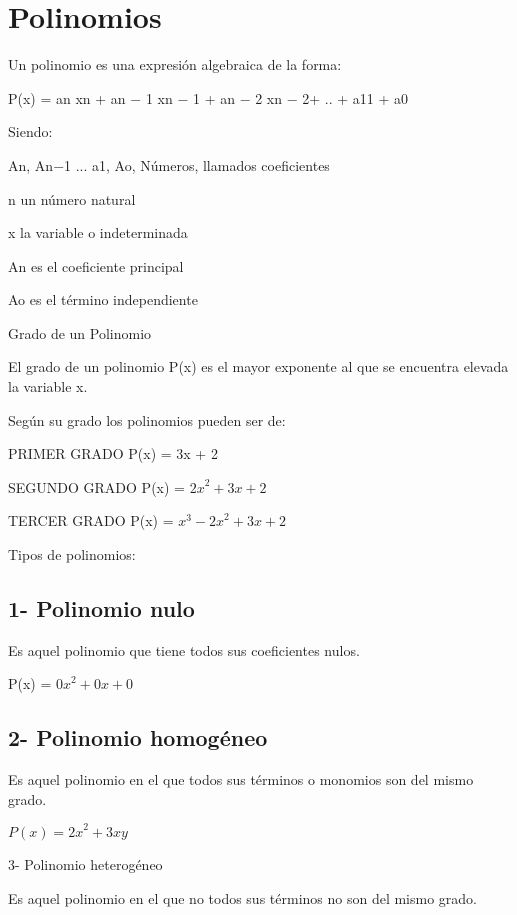 \documentclass{article}
\begin{document}
\bigskip

\section[Polinomios]{Polinomios}

\bigskip

Un polinomio es una expresi\'on algebraica de la forma:

P(x) = an xn + an $-$ 1 xn $-$ 1 + an $-$ 2 xn $-$ 2+ .. + a11 + a0


\bigskip

Siendo:

An, An$-$1 ... a1, Ao, N\'umeros, llamados coeficientes

n un n\'umero natural

x la variable o indeterminada

An es el coeficiente principal

Ao es el t\'ermino independiente

Grado de un Polinomio

El grado de un polinomio P(x) es el mayor exponente al que se encuentra elevada la variable x.

Seg\'un su grado los polinomios pueden ser de: \ 

PRIMER GRADO P(x) = 3x + 2

SEGUNDO GRADO P(x) = ${2x}^{2}+3x+2$

TERCER GRADO P(x) = $x^{3}-{2x}^{2}+3x+2$


\bigskip

Tipos de polinomios:

\subsection[1{}- Polinomio nulo]{1- Polinomio nulo}
Es aquel polinomio que tiene todos sus coeficientes nulos.

P(x) =  ${0x}^{2}+0x+0$


\bigskip

\subsection[2{}- Polinomio homog\'eneo]{2- Polinomio homog\'eneo}
Es aquel polinomio en el que todos sus t\'erminos o monomios son del mismo grado.

 $P(x)={2x}^{2}+3xy$

3- Polinomio heterog\'eneo

Es aquel polinomio en el que no todos sus t\'erminos no son del mismo grado.
\end{document}
